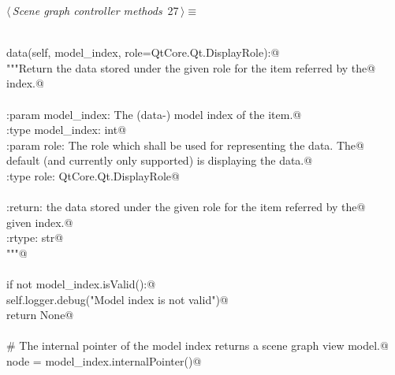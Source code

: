 \documentclass[
    a4paper,      %
    10pt,         %
    openright,    %
    notitlepage,  %
    parskip=half, %
]{scrreprt}       %
\theoremstyle{definition}                    %
\begin{document}
\begin{flushleft} \small
\begin{minipage}{\linewidth}\label{scrap26}\raggedright\small
{} $\langle\,${\itshape Scene graph controller methods}\nobreak\ {\footnotesize {27}}$\,\rangle\equiv$
\vspace{-1ex}
\begin{list}{}{} \item
\mbox{}\lstinline@@\\
\mbox{}\lstinline@def data(self, model_index, role=QtCore.Qt.DisplayRole):@\\
\mbox{}\lstinline@    """Return the data stored under the given role for the item referred by the@\\
\mbox{}\lstinline@    index.@\\
\mbox{}\lstinline@@\\
\mbox{}\lstinline@    :param model_index: The (data-) model index of the item.@\\
\mbox{}\lstinline@    :type model_index: int@\\
\mbox{}\lstinline@    :param role: The role which shall be used for representing the data. The@\\
\mbox{}\lstinline@                 default (and currently only supported) is displaying the data.@\\
\mbox{}\lstinline@    :type role:  QtCore.Qt.DisplayRole@\\
\mbox{}\lstinline@@\\
\mbox{}\lstinline@    :return: the data stored under the given role for the item referred by the@\\
\mbox{}\lstinline@             given index.@\\
\mbox{}\lstinline@    :rtype:  str@\\
\mbox{}\lstinline@    """@\\
\mbox{}\lstinline@@\\
\mbox{}\lstinline@    if not model_index.isValid():@\\
\mbox{}\lstinline@        self.logger.debug("Model index is not valid")@\\
\mbox{}\lstinline@        return None@\\
\mbox{}\lstinline@@\\
\mbox{}\lstinline@    # The internal pointer of the model index returns a scene graph view model.@\\
\mbox{}\lstinline@    node = model_index.internalPointer()@\\
\mbox{}\lstinline@@\\

\end{list}
\end{minipage}
\end{flushleft}
\end{document}
